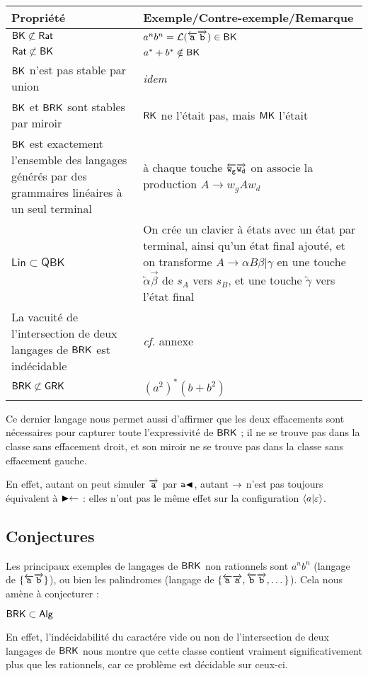 \documentclass[12pt, a4paper]{article}
\renewcommand{\L}{\mathcal{L}}
\begin{document}
    \begin{tabular}{|p{}|p{}|}
        \hline
        \textbf{Propriété} & \textbf{Exemple/Contre-exemple/Remarque} \\
        \hline
        $\mathsf{BK} \not\subset \mathsf{Rat}$ & $a^nb^n = \L({\egauche{a}\edroite{b}}) \in \BK$ \\
        \hline
        $\mathsf{Rat} \not\subset \mathsf{BK}$ & $a^*+b^* \notin \mathsf{BK}$ \\
        \hline
        $\mathsf{BK}$ n'est pas stable par union & \textit{idem} \\
        \hline
        $\mathsf{BK}$ et $\mathsf{BRK}$ sont stables par miroir & $\mathsf{RK}$ ne l'était pas, mais $\mathsf{MK}$ l'était \\
        \hline
        $\mathsf{BK}$ est exactement l'ensemble des langages générés par des grammaires linéaires à un seul terminal & à chaque touche $\overleftarrow{\mathtt{w_g}}\overrightarrow{\mathtt{w_d}}$ on associe la production $A \rightarrow w_gAw_d$ \\
        \hline
        $\mathsf{Lin} \subset \mathsf{QBK}$ & On crée un clavier à états avec un état par terminal, ainsi qu'un état final ajouté, et on transforme $A \rightarrow \alpha B \beta | \gamma$ en une touche $\overleftarrow{\alpha}\overrightarrow{\beta}$ de $s_A$ vers $s_B$, et une touche $\overleftarrow{\gamma}$ vers l'état final \\
        \hline
        La vacuité de l'intersection de deux langages de $\mathsf{BRK}$ est indécidable & \textit{cf.} annexe \\
        \hline
        $\mathsf{BRK} \not\subset \mathsf{GRK}$ & $(a^2)^*(b+b^2)$ \\
        \hline
    \end{tabular}

    
    Ce dernier langage nous permet aussi d'affirmer que les deux effacements sont nécessaires pour capturer toute l'expressivité de $\mathsf{BRK}$ ; il ne se trouve pas dans la classe sans effacement droit, et son miroir ne se trouve pas dans la classe sans effacement gauche.

    En effet, autant on peut simuler $\overrightarrow{\mathtt{a}}$ par $\mathtt{a}\mathord{\blacktriangleleft}$, autant $\mathord{\rightarrow}$ n'est pas toujours équivalent à $\mathord{\blacktriangleright}\mathord{\leftarrow}$ : elles n'ont pas le même effet sur la configuration $\left\langle a \middle| \varepsilon \right\rangle$.
         
    \subsection{Conjectures}\label{sectionclavsym}
    Les principaux exemples de langages de $\mathsf{BRK}$ non rationnels sont $a^nb^n$ (langage de $\{\overleftarrow{\mathtt{a}}\overrightarrow{\mathtt{b}}\}$), ou bien les palindromes (langage de $\{\overleftarrow{\mathtt{a}}\overrightarrow{\mathtt{a}},\overleftarrow{\mathtt{b}}\overrightarrow{\mathtt{b}}, \dots\}$). Cela nous amène à conjecturer :
    \begin{example}[Conjecture 1]
        $\mathsf{BRK} \subset \mathsf{Alg}$
    \end{example}
    En effet, l'indécidabilité du caractére vide ou non de l'intersection de deux langages de $\mathsf{BRK}$ nous montre que cette classe contient vraiment significativement plus que les rationnels, car ce problème est décidable sur ceux-ci.
    
\end{document}
